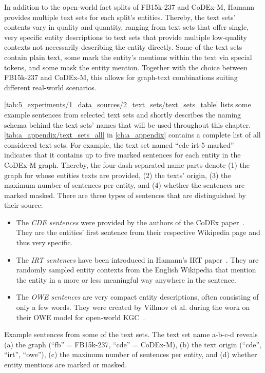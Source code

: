 In addition to the open-world fact splits of FB15k-237 and CoDEx-M, Hamann provides multiple text sets for each split's entities. Thereby, the text sets' contents vary in quality and quantity, ranging from text sets that offer single, very specific entity descriptions to text sets that provide multiple low-quality contexts not necessarily describing the entity directly. Some of the text sets contain plain text, some mark the entity's mentions within the text via special tokens, and some mask the entity mention. Together with the choice between FB15k-237 and CoDEx-M, this allows for graph-text combinations suiting different real-world scenarios.

\autoref{tab:5_experiments/1_data_sources/2_text_sets/text_sets_table} lists some example sentences from selected text sets and shortly describes the naming schema behind the text sets' names that will be used throughout this chapter. \autoref{tab:a_appendix/text_sets_all} in \autoref{ch:a_appendix} contains a complete list of all considered text sets. For example, the text set named ``cde-irt-5-marked'' indicates that it contains up to five marked sentences for each entity in the CoDEx-M graph. Thereby, the four dash-separated name parts denote (1) the graph for whose entities texts are provided, (2) the texts' origin, (3) the maximum number of sentences per entity, and (4) whether the sentences are marked masked. There are three types of sentences that are distinguished by their source:

\begin{itemize}
    \item The \emph{CDE sentences} were provided by the authors of the CoDEx paper~\cite{Safavi2020CoDExAC}. They are the entities' first sentence from their respective Wikipedia page and thus very specific.

    \item The \emph{IRT sentences} have been introduced in Hamann's IRT paper~\cite{IRT}. They are randomly sampled entity contexts from the English Wikipedia that mention the entity in a more or less meaningful way anywhere in the sentence.

    \item The \emph{OWE sentences} are very compact entity descriptions, often consisting of only a few words. They were created by Villmov et al. during the work on their OWE model for open-world KGC~\cite{Shah2019AnOE}.
\end{itemize}

\begin{table}
    \centering
    
    \caption{Example sentences from some of the text sets. The text set name a-b-c-d reveals (a) the graph (``fb'' = FB15k-237, ``cde'' = CoDEx-M), (b) the text origin (``cde'', ``irt'', ``owe''), (c) the maximum number of sentences per entity, and (d) whether entity mentions are marked or masked.}
    \label{tab:5_experiments/1_data_sources/2_text_sets/text_sets_table}
\end{table}
